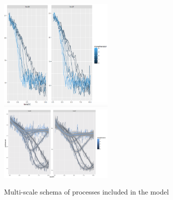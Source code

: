 \begin{figure}[h]
\centering
\includegraphics[width=0.49\textwidth]{figures/baseline_jobdist0.png}\\
\includegraphics[width=0.49\textwidth]{figures/real_indicjobDistance0_smoothed.png}
\caption{Multi-scale schema of processes included in the model}
\label{fig:model}
\end{figure}









